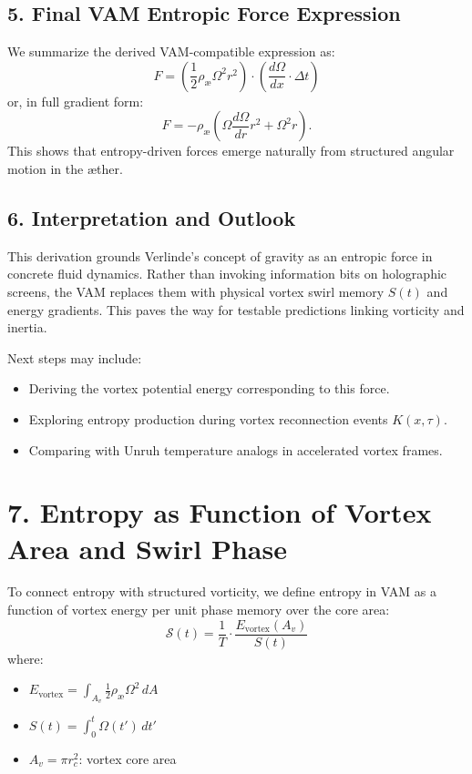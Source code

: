 \documentclass[11pt]{article}
\begin{document}
\subsection*{5. Final VAM Entropic Force Expression}

We summarize the derived VAM-compatible expression as:
\begin{equation}
    F = \left( \frac{1}{2} \rho_\text{\ae} \Omega^2 r^2 \right) \cdot \left( \frac{d\Omega}{dx} \cdot \Delta t \right)
\end{equation}
or, in full gradient form:
\begin{equation}
    F = -\rho_\text{\ae} \left( \Omega \frac{d\Omega}{dr} r^2 + \Omega^2 r \right).
\end{equation}
This shows that entropy-driven forces emerge naturally from structured angular motion in the æther.

\subsection*{6. Interpretation and Outlook}

This derivation grounds Verlinde's concept of gravity as an entropic force in concrete fluid dynamics. Rather than invoking information bits on holographic screens, the VAM replaces them with physical vortex swirl memory $S(t)$ and energy gradients. This paves the way for testable predictions linking vorticity and inertia.

Next steps may include:
\begin{itemize}
\item Deriving the vortex potential energy corresponding to this force.
    \item Exploring entropy production during vortex reconnection events $K(x, \tau)$.
\item Comparing with Unruh temperature analogs in accelerated vortex frames.
\end{itemize}

\section*{7. Entropy as Function of Vortex Area and Swirl Phase}

To connect entropy with structured vorticity, we define entropy in VAM as a function of vortex energy per unit phase memory over the core area:
\begin{equation}
    \mathcal{S}(t) = \frac{1}{T} \cdot \frac{E_\text{vortex}(A_v)}{S(t)}
\end{equation}
where:
\begin{itemize}
    \item $E_\text{vortex} = \int_{A_v} \frac{1}{2} \rho_\text{\ae} \Omega^2 \, dA$
    \item $S(t) = \int_0^t \Omega(t') \, dt'$
    \item $A_v = \pi r_c^2$: vortex core area
\end{itemize}
\end{document}
